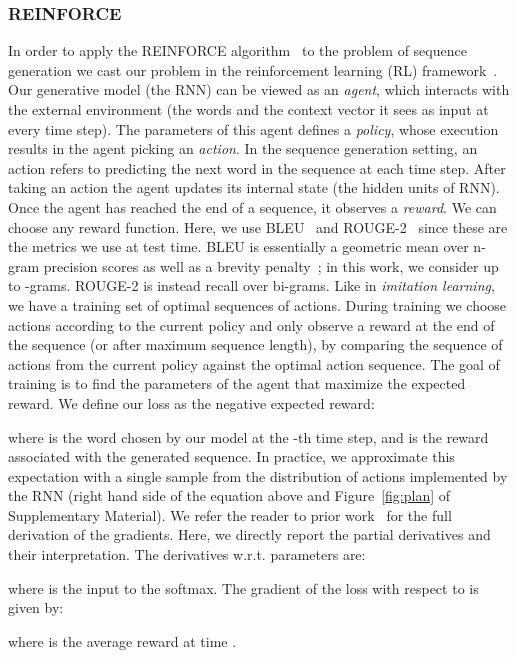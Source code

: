 \documentclass{article} \usepackage{iclr2016_conference,times}
\begin{document}
\subsubsection{REINFORCE} \label{model-reinforce}
In order to apply the REINFORCE algorithm~\citep{reinforce, zaremba-arxiv2015} to the problem of sequence generation we cast our problem in the reinforcement learning (RL) framework~\citep{sutton-rl}. Our generative model (the RNN) can be viewed as an {\em agent}, which interacts with the external environment (the words and the context vector it sees as input at every time step). The parameters of this agent defines a {\em policy}, whose execution results in the agent picking an {\em action}. In the sequence generation setting, an action refers to predicting the next word in the sequence at each time step. 
After taking an action the agent updates its internal state (the hidden units of RNN). Once the agent has reached the end of a sequence, it observes a {\em reward}. We can choose any reward function. Here, we use BLEU~\citep{bleu} and ROUGE-2~\citep{rouge} since these are the metrics we use at test time. BLEU is essentially a geometric mean over n-gram precision scores  as well as a brevity penalty~\citep{liang2006}; in this work, we consider up to -grams. ROUGE-2 is instead recall over bi-grams. 
Like in {\em imitation learning}, we have a training set of optimal sequences of actions. 
During training we choose actions according to the current policy and only observe a reward at the end of the sequence (or after maximum sequence length), by comparing the sequence of actions from the current policy against the optimal action sequence.
The goal of training is to find the parameters of the agent that maximize the expected reward.
We define our loss as the negative expected reward:

where  is the word chosen by our model at the -th time step, and  is the reward associated with the generated sequence. 
In practice, we approximate this expectation with a single sample
from the distribution of actions implemented by the RNN (right hand side of the equation above and Figure~\ref{fig:plan} of Supplementary Material). 
We refer the reader to prior work~\citep{zaremba-arxiv2015,reinforce} for the full derivation of the gradients. Here, we directly report the partial derivatives and their interpretation. The derivatives w.r.t. parameters are:

where  is the input to the softmax. 
The gradient of the loss  with respect to  is given by:

where  is the average reward at time . 
\end{document}
